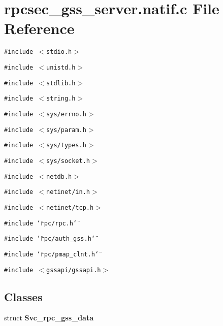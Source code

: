 \section{rpcsec\_\-gss\_\-server.natif.c File Reference}
\label{rpcsec__gss__server_8natif_8c}
{\tt \#include $<$stdio.h$>$}\par
{\tt \#include $<$unistd.h$>$}\par
{\tt \#include $<$stdlib.h$>$}\par
{\tt \#include $<$string.h$>$}\par
{\tt \#include $<$sys/errno.h$>$}\par
{\tt \#include $<$sys/param.h$>$}\par
{\tt \#include $<$sys/types.h$>$}\par
{\tt \#include $<$sys/socket.h$>$}\par
{\tt \#include $<$netdb.h$>$}\par
{\tt \#include $<$netinet/in.h$>$}\par
{\tt \#include $<$netinet/tcp.h$>$}\par
{\tt \#include \char`\"{}rpc/rpc.h\char`\"{}}\par
{\tt \#include \char`\"{}rpc/auth\_\-gss.h\char`\"{}}\par
{\tt \#include \char`\"{}rpc/pmap\_\-clnt.h\char`\"{}}\par
{\tt \#include $<$gssapi/gssapi.h$>$}\par
\subsection*{Classes}
\begin{CompactItemize}
\item 
struct {\bf Svc\_\-rpc\_\-gss\_\-data}
\end{CompactItemize}
